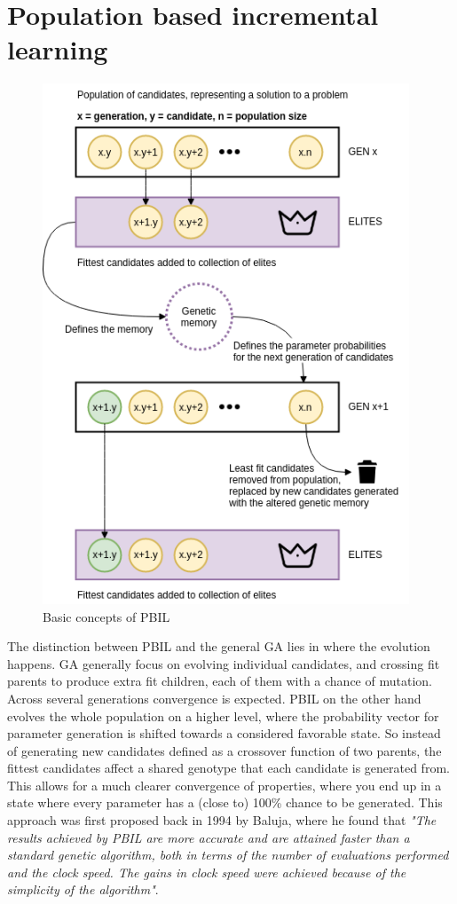 \documentclass[a4paper,english]{report}
\begin{document}
	\pagebreak
	\section{Population based incremental learning}
	\begin{figure}[ht]
		\centering
		\includegraphics[width=310pt]{PBIL}
		\caption{Basic concepts of PBIL}
	\end{figure}
	The distinction between PBIL and the general GA lies in where the evolution happens. GA generally focus on evolving individual candidates, and crossing fit parents to produce extra fit children, each of them with a chance of mutation. Across several generations convergence is expected. PBIL on the other hand evolves the whole population on a higher level, where the probability vector for parameter generation is shifted towards a considered favorable state. So instead of generating new candidates defined as a crossover function of two parents, the fittest candidates affect a shared genotype that each candidate is generated from. This allows for a much clearer convergence of properties, where you end up in a state where every parameter has a (close to) 100\% chance to be generated. This approach was first proposed back in 1994 by Baluja, where he found that \textit{"The results achieved by PBIL are more accurate and are attained faster than a standard genetic algorithm, both in terms of the number of evaluations performed and the clock speed. The gains in clock speed were achieved because of the simplicity of the algorithm"}\cite{pbil}.
\end{document}

